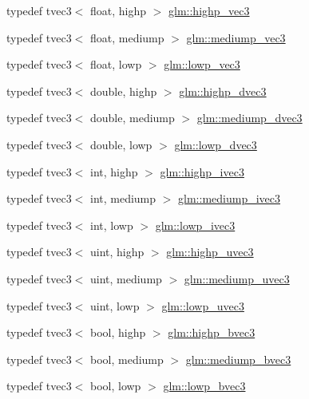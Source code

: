 \begin{DoxyCompactItemize}
\item 
typedef tvec3$<$ float, highp $>$ \hyperlink{group__core__precision_ga1ef07d2502ea09b1e63998813a3d4330}{glm\-::highp\-\_\-vec3}
\item 
typedef tvec3$<$ float, mediump $>$ \hyperlink{group__core__precision_gac76bf24aca62ca13269d262121d04ceb}{glm\-::mediump\-\_\-vec3}
\item 
typedef tvec3$<$ float, lowp $>$ \hyperlink{group__core__precision_ga0229a1c4abd7c51f15eeb7a0fec3846b}{glm\-::lowp\-\_\-vec3}
\item 
typedef tvec3$<$ double, highp $>$ \hyperlink{group__core__precision_ga54e097f7cd1f1cd46cc47eec67218bd3}{glm\-::highp\-\_\-dvec3}
\item 
typedef tvec3$<$ double, mediump $>$ \hyperlink{group__core__precision_ga4f6942e5a5c9f5dc5a0e1eed980d2ecd}{glm\-::mediump\-\_\-dvec3}
\item 
typedef tvec3$<$ double, lowp $>$ \hyperlink{group__core__precision_ga88d318815a9af448bddcb16fceb155c5}{glm\-::lowp\-\_\-dvec3}
\item 
typedef tvec3$<$ int, highp $>$ \hyperlink{group__core__precision_gaef51de6bc442bfce2602dc301708720a}{glm\-::highp\-\_\-ivec3}
\item 
typedef tvec3$<$ int, mediump $>$ \hyperlink{group__core__precision_ga16a38c6077c2e83375ee258cd95e224b}{glm\-::mediump\-\_\-ivec3}
\item 
typedef tvec3$<$ int, lowp $>$ \hyperlink{group__core__precision_gad03cd497aea76c671fda2ce1d697e905}{glm\-::lowp\-\_\-ivec3}
\item 
typedef tvec3$<$ uint, highp $>$ \hyperlink{group__core__precision_ga90ab9c4694f5af23c7dcd4eb9e47e255}{glm\-::highp\-\_\-uvec3}
\item 
typedef tvec3$<$ uint, mediump $>$ \hyperlink{group__core__precision_ga628d87a2d3b8e287d569c6eb12d8e051}{glm\-::mediump\-\_\-uvec3}
\item 
typedef tvec3$<$ uint, lowp $>$ \hyperlink{group__core__precision_gab6f49c51783c774550f5217aecabd1d9}{glm\-::lowp\-\_\-uvec3}
\item 
typedef tvec3$<$ bool, highp $>$ \hyperlink{group__core__precision_gac35c0ff5b9eead09e905b4aa09d1e954}{glm\-::highp\-\_\-bvec3}
\item 
typedef tvec3$<$ bool, mediump $>$ \hyperlink{group__core__precision_ga39d35dfb49fff9cf4a6458d8027d2a8b}{glm\-::mediump\-\_\-bvec3}
\item 
typedef tvec3$<$ bool, lowp $>$ \hyperlink{group__core__precision_ga9ebdb78c611619993b9d5b182010529d}{glm\-::lowp\-\_\-bvec3}

\end{DoxyCompactItemize}
